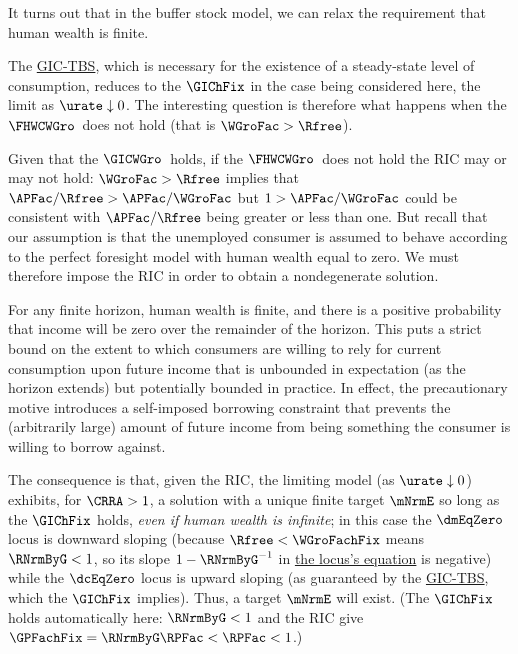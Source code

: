 \documentclass{econark}
\begin{document}
It turns out that in the buffer stock model, we can relax the requirement that human wealth is finite.  

The \hyperref[eq:GICExistsSoln]{GIC-TBS}, which is necessary for the existence of a steady-state level of consumption, reduces to the $\GIChFix$ in the case being considered here, the limit as $\urate \downarrow 0$.  The interesting question is therefore what happens when the $\FHWCWGro$~does not hold (that is $\WGroFac > \Rfree$).  

Given that the $\GICWGro$~holds, if the $\FHWCWGro$~does not hold the RIC may or may not hold:  $\WGroFac > \Rfree$ implies that $\APFac/\Rfree > \APFac/\WGroFac$ but $1 > \APFac/\WGroFac$ could be consistent with $\APFac/\Rfree$ being greater or less than one.  But recall that our assumption is that the unemployed consumer is assumed to behave according to the perfect foresight model with human wealth equal to zero.  We must therefore impose the RIC in order to obtain a nondegenerate solution.

For any finite horizon, human wealth is finite, and there is a positive probability that income will be zero over the remainder of the horizon.  This puts a strict bound on the extent to which consumers are willing to rely for current consumption upon future income that is unbounded in expectation (as the horizon extends) but potentially bounded in practice.  In effect, the precautionary motive introduces a self-imposed borrowing constraint that prevents the (arbitrarily large) amount of future income from being something the consumer is willing to borrow against.

The consequence is that, given the RIC, the limiting model (as $\urate \downarrow 0$) exhibits, for $\CRRA > 1$, a solution with a unique finite target $\mNrmE$ so long as the $\GIChFix$ holds, {\it even if human wealth is infinite}; in this case the $\dmEqZero$ locus is downward sloping (because $\Rfree < \WGroFachFix$ means $\RNrmByG < 1$, so its slope $1-\RNrmByG^{-1}$ in \hyperref[eq:mDelEqZero]{the locus's equation} is negative) while the $\dcEqZero$ locus is upward sloping (as guaranteed by the \hyperref[eq:GICExistsSoln]{GIC-TBS}, which the $\GIChFix$ implies).  Thus, a target $\mNrmE$ will exist.  (The $\GIChFix$ holds automatically here: $\RNrmByG < 1$ and the RIC give $\GPFachFix = \RNrmByG\RPFac < \RPFac < 1$.)
\end{document}
